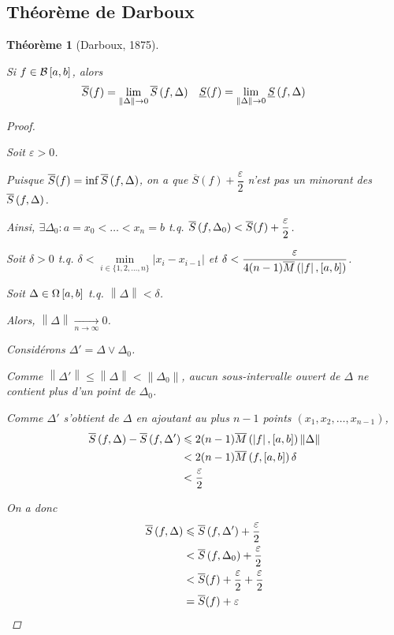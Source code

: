 \documentclass{report}
\newcommand*{\Ssup}[1]{\overline{S}(#1)}
\newcommand*{\Sinf}[1]{\underline{S}(#1)}
\newcommand*{\dlim}[3]{\displaystyle\lim_{#1 \to #2}#3}
\newcommand*{\raffinement}[2]{#1 \vee #2}
\newcommand*{\norme}[1]{\left\| #1 \right\|}
\newcommand*{\abs}[1]{\left| #1 \right|}
\newcommand*{\eps}{\varepsilon}
\newcommand*{\lte}{\leqslant}
\newtheorem*{thm}{Th\'eor\`eme}
\theoremstyle{definition}
\theoremstyle{remark}
\begin{document}
	\subsection{Th\'eor\`eme de Darboux}
	\begin{thm}[Darboux, 1875]
		~

		Si $f \in \bornee$, alors
		\begin{align*}
			\begin{split}
				\Ssup{f}&= \dlim{\norme{\Delta}}{0}{\ssup{f}}
			\end{split}
			&
			\begin{split}
				\Sinf{f}&= \dlim{\norme{\Delta}}{0}{\sinf{f}}
			\end{split}
		\end{align*}

		\begin{proof}~

			Soit $\eps>0$.

			Puisque $\Ssup{f} = \inf \ssup{f}$, on a que $\Ssup{f} + \dfrac{\eps}{2}$ n'est pas un minorant des $\ssup{f}$.

			Ainsi, $\exists\Delta_0 : a=x_0 < \dotsc < x_n=b$ t.q. $\ssup{f}[\Delta_0] < \Ssup{f} + \dfrac{\eps}{2}$.

			Soit $\delta>0$ t.q. $\delta < \min\limits_{i \in \{1,2,\dots,n\}}\abs{x_i-x_{i-1}}$ et $\delta < \dfrac{\eps}{4 (n-1) \msup{\abs{f}}}$.

			Soit $\Delta \in \partitions$ t.q. $\norme{\Delta} < \delta$.

			Alors, $\norme{\Delta} \xrightarrow[n \to \infty]{} 0$.

			Consid\'erons $\Delta' = \raffinement{\Delta}{\Delta_0}$.

			Comme $\norme{\Delta'} \lte \norme{\Delta} < \norme{\Delta_0}$, aucun sous-intervalle ouvert de $\Delta$ ne contient plus d'un point de $\Delta_0$.

			Comme $\Delta'$ s'obtient de $\Delta$ en ajoutant au plus $n-1$ points $\left( x_1, x_2, \dotsc, x_{n-1} \right)$,
			\begin{align*}
				\ssup{f} - \ssup{f}[\Delta'] &\lte 2(n-1) \msup{\abs{f}} \norme{\Delta}\\
				&< 2(n-1) \msup{f} \delta\\
				&< \dfrac{\eps}{2}
			\end{align*}

			On a donc
			\begin{align*}
				\ssup{f} &\lte \ssup{f}[\Delta'] + \dfrac{\eps}{2}\\
				&< \ssup{f}[\Delta_0] + \dfrac{\eps}{2}\\
				&< \Ssup{f} + \dfrac{\eps}{2} + \dfrac{\eps}{2}\\
				&= \Ssup{f} + \eps
			\end{align*}


\end{proof}
\end{thm}
\end{document}
